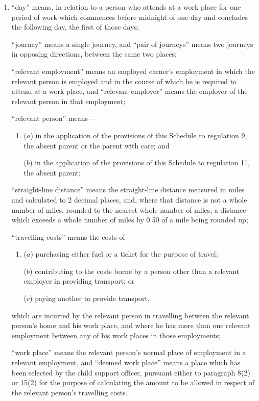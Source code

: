 \documentclass[a4paper]{article}
\begin{document}
\begin{enumerate}\item[]
“day” means, in relation to a person who attends at a work place for one period of work which commences before midnight of one day and concludes the following day, the first of those days;

“journey” means a single journey, and “pair of journeys” means two journeys in opposing directions, between the same two places;

“relevant employment” means an employed earner’s employment in which the relevant person is employed and in the course of which he is required to attend at a work place, and “relevant employer” means the employer of the relevant person in that employment;

“relevant person” means—
\begin{enumerate}\item[]
($a$) in the application of the provisions of this Schedule to regulation 9, the absent parent or the parent with care; and

($b$) in the application of the provisions of this Schedule to regulation 11, the absent parent;
\end{enumerate}

“straight-line distance” means the straight-line distance measured in miles and calculated to 2 decimal places, and, where that distance is not a whole number of miles, rounded to the nearest whole number of miles, a distance which exceeds a whole number of miles by 0.50 of a mile being rounded up;

“travelling costs” means the costs of—
\begin{enumerate}\item[]
($a$) purchasing either fuel or a ticket for the purpose of travel;

($b$) contributing to the costs borne by a person other than a relevant employer in providing transport; or

($c$) paying another to provide transport,
\end{enumerate}
which are incurred by the relevant person in travelling between the relevant person’s home and his work place, and where he has more than one relevant employment between any of his work places in those employments;

“work place” means the relevant person’s normal place of employment in a relevant employment, and “deemed work place” means a place which has been selected by the child support officer, pursuant either to paragraph 8(2) or 15(2) for the purpose of calculating the amount to be allowed in respect of the relevant person’s travelling costs.
\end{enumerate}
\end{document}
